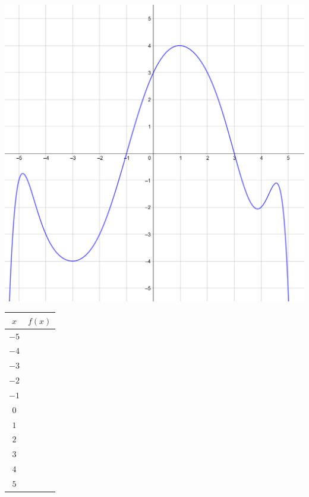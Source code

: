 \documentclass[
	classe=$1^{ere}$STI2D
]{coursclass}
\begin{document}
\begin{exemple}
	\begin{minipage}{0.7\linewidth}
		\includegraphics[width=\linewidth]{graphe 1.png}
	\end{minipage}
	\begin{minipage}{0.3\linewidth}
		\begin{center}
			\renewcommand{\arraystretch}{1.2}
			\begin{tabular}{|c|c|}
				\hline $x$  & $f(x)$ \\
				\hline $-5$ &        \\
				\hline $-4$ &        \\
				\hline $-3$ &        \\
				\hline $-2$ &        \\
				\hline $-1$ &        \\
				\hline $0$  &        \\
				\hline $1$  &        \\
				\hline $2$  &        \\
				\hline $3$  &        \\
				\hline $4$  &        \\
				\hline $5$  &        \\
				\hline
			\end{tabular}


\end{center}
\end{minipage}
\end{exemple}
\end{document}
